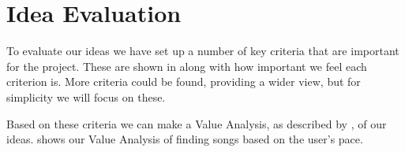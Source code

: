 \section{Idea Evaluation}
%
To evaluate our ideas we have set up a number of key criteria that are important for the project. These are shown in  along with how important we feel each criterion is. More criteria could be found, providing a wider view, but for simplicity we will focus on these.


Based on these criteria we can make a Value Analysis, as described by \citet[ pp. 118-120]{essence}, of our ideas.  shows our Value Analysis of finding songs based on the user's pace.


